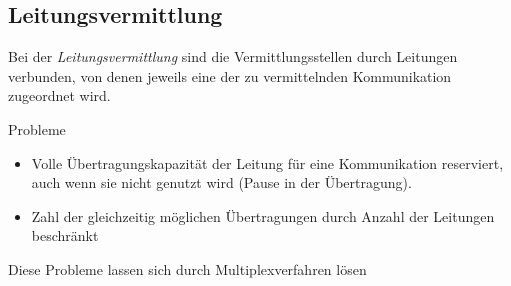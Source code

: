 \documentclass[12pt]{report}
\begin{document}
\subsection{Leitungsvermittlung}
\begin{defbox}
  Bei der \textit{Leitungsvermittlung} sind die Vermittlungsstellen durch Leitungen verbunden,
  von denen jeweils eine der zu vermittelnden Kommunikation zugeordnet wird.

  Probleme
  \begin{itemize}
    \item Volle Übertragungskapazität der Leitung für eine Kommunikation reserviert,
          auch wenn sie nicht genutzt wird (Pause in der Übertragung).

    \item Zahl der gleichzeitig möglichen Übertragungen durch Anzahl der Leitungen beschränkt
  \end{itemize}

  Diese Probleme lassen sich durch Multiplexverfahren lösen
\end{defbox}
\end{document}
